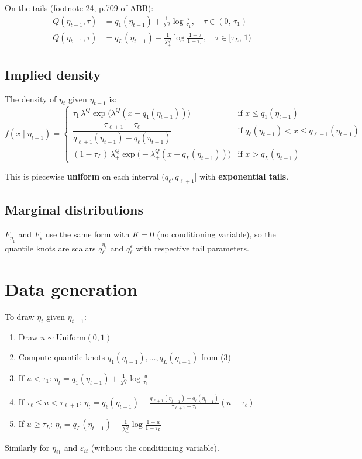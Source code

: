 \documentclass[12pt]{article}
\begin{document}
On the tails (footnote 24, p.709 of ABB):
\begin{align}
Q(\eta_{t-1}, \tau) &= q_1(\eta_{t-1}) + \frac{1}{\lambda^Q}\log\frac{\tau}{\tau_1}, \quad \tau \in (0,\, \tau_1) \\[6pt]
Q(\eta_{t-1}, \tau) &= q_L(\eta_{t-1}) - \frac{1}{\lambda_+^Q}\log\frac{1-\tau}{1-\tau_L}, \quad \tau \in [\tau_L,\, 1)
\end{align}

\subsection{Implied density}

The density of $\eta_t$ given $\eta_{t-1}$ is:
\begin{equation}
f(x \mid \eta_{t-1}) = \begin{cases}
\tau_1 \,\lambda^Q \exp\bigl(\lambda^Q(x - q_1(\eta_{t-1}))\bigr) & \text{if } x \le q_1(\eta_{t-1}) \\[8pt]
\dfrac{\tau_{\ell+1} - \tau_\ell}{q_{\ell+1}(\eta_{t-1}) - q_\ell(\eta_{t-1})} & \text{if } q_\ell(\eta_{t-1}) < x \le q_{\ell+1}(\eta_{t-1}) \\[8pt]
(1-\tau_L)\,\lambda_+^Q \exp\bigl(-\lambda_+^Q(x - q_L(\eta_{t-1}))\bigr) & \text{if } x > q_L(\eta_{t-1})
\end{cases}
\end{equation}

This is piecewise \textbf{uniform} on each interval $(q_\ell, q_{\ell+1}]$ with \textbf{exponential tails}.

\subsection{Marginal distributions}

$F_{\eta_1}$ and $F_\varepsilon$ use the same form with $K=0$ (no conditioning variable), so the quantile knots are scalars $q_\ell^{\eta_1}$ and $q_\ell^\varepsilon$ with respective tail parameters.

\section{Data generation}

To draw $\eta_t$ given $\eta_{t-1}$:
\begin{enumerate}
\item Draw $u \sim \mathrm{Uniform}(0,1)$
\item Compute quantile knots $q_1(\eta_{t-1}), \ldots, q_L(\eta_{t-1})$ from (3)
\item If $u < \tau_1$: \quad $\eta_t = q_1(\eta_{t-1}) + \frac{1}{\lambda^Q}\log\frac{u}{\tau_1}$
\item If $\tau_\ell \le u < \tau_{\ell+1}$: \quad $\eta_t = q_\ell(\eta_{t-1}) + \frac{q_{\ell+1}(\eta_{t-1}) - q_\ell(\eta_{t-1})}{\tau_{\ell+1} - \tau_\ell}(u - \tau_\ell)$
\item If $u \ge \tau_L$: \quad $\eta_t = q_L(\eta_{t-1}) - \frac{1}{\lambda_+^Q}\log\frac{1-u}{1-\tau_L}$
\end{enumerate}
Similarly for $\eta_{i1}$ and $\varepsilon_{it}$ (without the conditioning variable).
\end{document}
